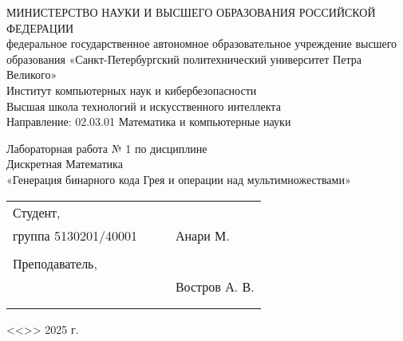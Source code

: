 \documentclass[12pt,a4paper]{article}
\begin{document}
\begin{center}
		\hfill \break
		\hfill \break
		\normalsize{МИНИСТЕРСТВО НАУКИ И ВЫСШЕГО ОБРАЗОВАНИЯ РОССИЙСКОЙ ФЕДЕРАЦИИ\\
			федеральное государственное автономное образовательное учреждение высшего образования «Санкт-Петербургский политехнический университет Петра Великого»\\[10pt]}
		\normalsize{Институт компьютерных наук и кибербезопасности}\\[10pt] 
		\normalsize{Высшая школа технологий и искусственного интеллекта}\\[10pt] 
		\normalsize{Направление: 02.03.01 Математика и компьютерные науки}\\
		\vspace{75pt}
		
		\vspace{2pt}
		{\large Лабораторная работа № 1 по дисциплине\\ Дискретная Математика }\\
		\large{«Генерация бинарного кода Грея и операции над мультимножествами»}\\
		\hfill \break
		
		\hfill \break
		\hfill \break
	\end{center}
	
	\small{ 
		\begin{tabular}{lrrl}
			\!\!\!Студент, & \hspace{0cm} & & \\
			\!\!\!группа 5130201/40001 & \hspace{1.5cm} & \underline{\hspace{3cm}} & \hspace{-0.3cm}Анари М.  \\\\
			\!\!\!Преподаватель, & \hspace{1cm} & \\
			\!\!\! & \hspace{1cm} & \underline{\hspace{3cm}} &  Востров А. В. \\\\
			&&\hspace{5cm}
		\end{tabular}
		\begin{flushright}
			<<\underline{\hspace{1cm}}>>\underline{\hspace{2.5cm}} 2025 г.
		\end{flushright}
	}
	
\end{document}
